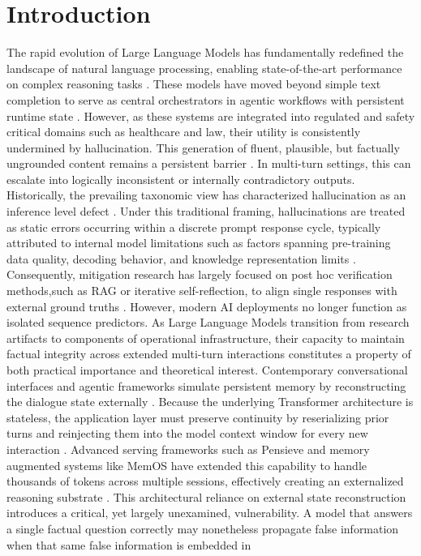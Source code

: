\documentclass[manuscript, screen, review]{jair}
\begin{document}
\maketitle

\section{Introduction}

The rapid evolution of Large Language Models has fundamentally redefined the landscape of natural language processing, enabling state-of-the-art performance on complex reasoning tasks \parencite{qasim2025rdolt,gemini2024gemini}. These models have moved beyond simple text completion to serve as central orchestrators in agentic workflows with persistent runtime state \parencite{ran2026caveagent}. However, as these systems are integrated into regulated and safety critical domains such as healthcare and law, their utility is consistently undermined by hallucination. This generation of fluent, plausible, but factually ungrounded content remains a persistent barrier \parencite{ji2023survey,alansari2026llmhallucination,mohammadabadi2026survey}. In multi-turn settings, this can escalate into logically inconsistent or internally contradictory outputs. Historically, the prevailing taxonomic view has characterized hallucination as an inference level defect \parencite{huang2025survey}. Under this traditional framing, hallucinations are treated as static errors occurring within a discrete prompt response cycle, typically attributed to internal model limitations such as factors spanning pre-training data quality, decoding behavior, and knowledge representation limits \parencite{islam2024comprehensive,li2024dawn}. Consequently, mitigation research has largely focused on post hoc verification methods,such as RAG or iterative self-reflection, to align single responses with external ground truths \parencite{ji2023survey,hiriyanna2025multi}. However, modern AI deployments no longer function as isolated sequence predictors. As Large Language Models transition from research artifacts to components of operational infrastructure, their capacity to maintain factual integrity across extended multi-turn interactions constitutes a property of both practical importance and theoretical interest. Contemporary conversational interfaces and agentic frameworks simulate persistent memory by reconstructing the dialogue state externally \parencite{packer2023memgpt}. Because the underlying Transformer architecture is stateless, the application layer must preserve continuity by reserializing prior turns and reinjecting them into the model context window for every new interaction \parencite{yu2025stateful,pinecone2023context}. Advanced serving frameworks such as Pensieve and memory augmented systems like MemOS have extended this capability to handle thousands of tokens across multiple sessions, effectively creating an externalized reasoning substrate \parencite{yu2025stateful,li2025memos}. This architectural reliance on external state reconstruction introduces a critical, yet largely unexamined, vulnerability. A model that answers a single factual question correctly may nonetheless propagate false information when that same false information is embedded in 
\end{document}
